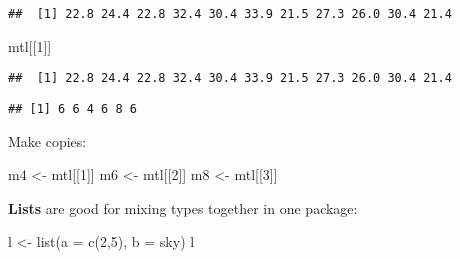 \documentclass[
]{article}
\newenvironment{Shaded}{\begin{snugshade}}{\end{snugshade}}
\newcommand{\AttributeTok}[1]{\textcolor[rgb]{0.77,0.63,0.00}{#1}}
\newcommand{\DecValTok}[1]{\textcolor[rgb]{0.00,0.00,0.81}{#1}}
\newcommand{\FunctionTok}[1]{\textcolor[rgb]{0.00,0.00,0.00}{#1}}
\newcommand{\NormalTok}[1]{#1}
\newcommand{\OtherTok}[1]{\textcolor[rgb]{0.56,0.35,0.01}{#1}}
\newcommand{\SpecialCharTok}[1]{\textcolor[rgb]{0.00,0.00,0.00}{#1}}
\newcommand{\StringTok}[1]{\textcolor[rgb]{0.31,0.60,0.02}{#1}}
\begin{document}
\begin{Shaded}
\end{Shaded}

\begin{verbatim}
##  [1] 22.8 24.4 22.8 32.4 30.4 33.9 21.5 27.3 26.0 30.4 21.4
\end{verbatim}

\begin{Shaded}
\begin{Highlighting}[]
\NormalTok{mtl[[}\DecValTok{1}\NormalTok{]]}
\end{Highlighting}
\end{Shaded}

\begin{verbatim}
##  [1] 22.8 24.4 22.8 32.4 30.4 33.9 21.5 27.3 26.0 30.4 21.4
\end{verbatim}

\begin{Shaded}
\end{Shaded}

\begin{verbatim}
## [1] 6 6 4 6 8 6
\end{verbatim}

Make copies:

\begin{Shaded}
\begin{Highlighting}[]
\NormalTok{m4 }\OtherTok{\textless{}{-}}\NormalTok{ mtl[[}\DecValTok{1}\NormalTok{]]}
\NormalTok{m6 }\OtherTok{\textless{}{-}}\NormalTok{ mtl[[}\DecValTok{2}\NormalTok{]]}
\NormalTok{m8 }\OtherTok{\textless{}{-}}\NormalTok{ mtl[[}\DecValTok{3}\NormalTok{]]}
\end{Highlighting}
\end{Shaded}

\textbf{Lists} are good for mixing types together in one package:

\begin{Shaded}
\begin{Highlighting}[]
\NormalTok{l }\OtherTok{\textless{}{-}} \FunctionTok{list}\NormalTok{(}\AttributeTok{a =} \FunctionTok{c}\NormalTok{(}\DecValTok{2}\NormalTok{,}\DecValTok{5}\NormalTok{), }\AttributeTok{b =} \StringTok{\textquotesingle{}sky\textquotesingle{}}\NormalTok{)}
\NormalTok{l}
\end{Highlighting}
\end{Shaded}
\end{document}
